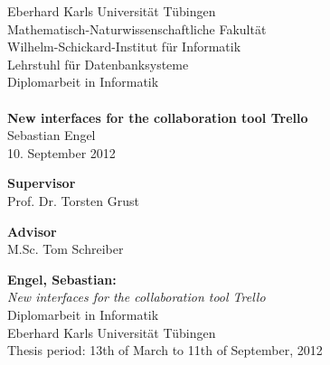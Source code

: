 \documentclass[twoside,12pt,a4paper, parskip=full-]{report}
\begin{document}

\begin{titlepage}
 \begin{center}
  {\LARGE Eberhard Karls Universit\"at T\"ubingen}\\
  {\large Mathematisch-Naturwissenschaftliche Fakultät \\
Wilhelm-Schickard-Institut für Informatik\\
Lehrstuhl für Datenbanksysteme\\[4cm]}
  {\huge Diplomarbeit in Informatik\\
  \\[2cm]}
  {\Large\bf  New interfaces for the collaboration tool Trello\\[1.5cm]}
 {\large Sebastian Engel}\\[0.5cm]
10. September 2012\\[4cm]

  \parbox{7cm}{\begin{center}

{\small\bf Supervisor}\\[0.5cm]
{\large Prof. Dr. Torsten Grust}\\
	\end{center}
	}\hfill\parbox{7cm}{\begin{center}
{\small\bf Advisor}\\[0.5cm]
  {\large M.Sc. Tom Schreiber}\\
	\end{center}
 }
  \end{center}
\end{titlepage}


\thispagestyle{empty}
\vspace*{\fill}
\begin{minipage}{11.2cm}
\textbf{Engel, Sebastian:}\\
\emph{New interfaces for the collaboration tool Trello}\\ Diplomarbeit in Informatik\\
Eberhard Karls Universit\"at T\"ubingen\\
Thesis period: 13th of March to 11th of September, 2012
\end{minipage}
\newpage
\end{document}
